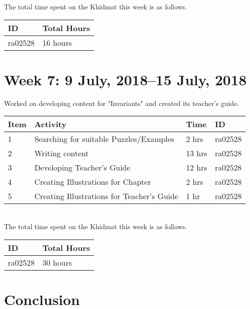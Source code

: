 \documentclass{article}
\begin{document}
The total time spent on the Khidmat this week is as follows.

\begin{tabular}{|l|l|}
  \hline
  ID & Total Hours\\\hline\hline
  ra02528 & 16 hours\\\hline
\end{tabular}

\newpage %

\section*{Week 7: 9 July, 2018--15 July, 2018}
Worked on developing content for "Invariants" and created its teacher's guide.\\


\begin{tabular}{|l|l|l|l|}
  \hline
  Item 	& Activity & Time & ID \\\hline\hline
  1	& Searching for suitable Puzzles/Examples & 2 hrs & ra02528 \\\hline
  2	& Writing content & 13 hrs & ra02528 \\\hline
  3	& Developing Teacher's Guide & 12 hrs & ra02528 \\\hline
  4	& Creating Illustrations for Chapter &  2 hrs & ra02528 \\\hline
  5	& Creating Illustrations for Teacher's Guide & 1 hr & ra02528 \\\hline
\end{tabular}\\

The total time spent on the Khidmat this week is as follows.

\begin{tabular}{|l|l|}
  \hline
  ID & Total Hours\\\hline\hline
  ra02528 & 30 hours\\\hline
\end{tabular}

\newpage
\section*{Conclusion}

\end{document}
